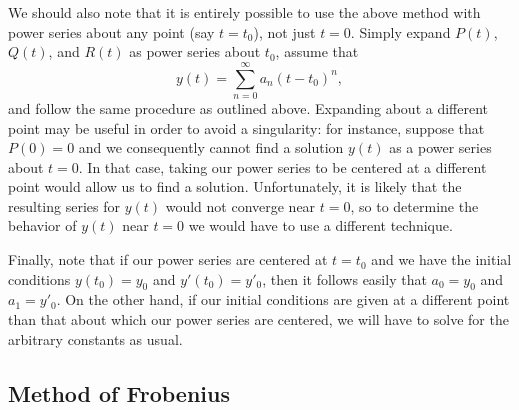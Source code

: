\documentclass{myart}
\begin{document}
We should also note that it is entirely possible to use the above method with power series about any point (say $t = t_0$), not just $t = 0$. Simply expand $P(t)$, $Q(t)$, and $R(t)$ as power series about $t_0$, assume that
\begin{equation*}
y(t) = \sum_{n=0}^\infty a_n (t - t_0)^n,
\end{equation*}
and follow the same procedure as outlined above. Expanding about a different point may be useful in order to avoid a singularity: for instance, suppose that $P(0) = 0$ and we consequently cannot find a solution $y(t)$ as a power series about $t = 0$. In that case, taking our power series to be centered at a different point would allow us to find a solution. Unfortunately, it is likely that the resulting series for $y(t)$ would not converge near $t = 0$, so to determine the behavior of $y(t)$ near $t = 0$ we would have to use a different technique.

Finally, note that if our power series are centered at $t = t_0$ and we have the initial conditions $y(t_0) = y_0$ and $y'(t_0) = y'_0$, then it follows easily that $a_0 = y_0$ and $a_1 = y'_0$. On the other hand, if our initial conditions are given at a different point than that about which our power series are centered, we will have to solve for the arbitrary constants as usual.

\subsection{Method of Frobenius} \label{subsec:frobenius}
\end{document}

